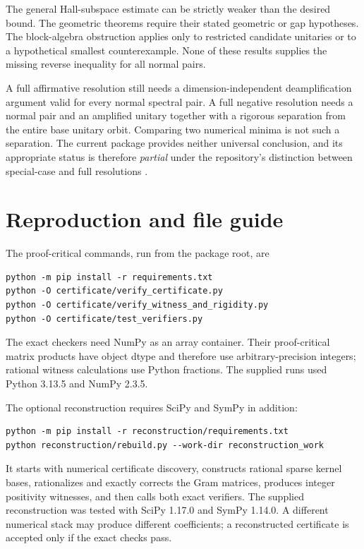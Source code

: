 \documentclass[11pt]{article}
\theoremstyle{definition}\newtheorem{definition}[theorem]{Definition}
\theoremstyle{remark}\newtheorem{remark}[theorem]{Remark}
\begin{document}
The general Hall-subspace estimate can be strictly weaker than the desired bound. The geometric theorems require their stated geometric or gap hypotheses. The block-algebra obstruction applies only to restricted candidate unitaries or to a hypothetical smallest counterexample. None of these results supplies the missing reverse inequality for all normal pairs.

A full affirmative resolution still needs a dimension-independent deamplification argument valid for every normal spectral pair. A full negative resolution needs a normal pair and an amplified unitary together with a rigorous separation from the entire base unitary orbit. Comparing two numerical minima is not such a separation. The current package provides neither universal conclusion, and its appropriate status is therefore \emph{partial} under the repository's distinction between special-case and full resolutions \cite{contributing}.

\appendix
\section{Reproduction and file guide}
The proof-critical commands, run from the package root, are
\begin{verbatim}
python -m pip install -r requirements.txt
python -O certificate/verify_certificate.py
python -O certificate/verify_witness_and_rigidity.py
python -O certificate/test_verifiers.py
\end{verbatim}
The exact checkers need NumPy as an array container. Their proof-critical matrix products have object dtype and therefore use arbitrary-precision integers; rational witness calculations use Python fractions. The supplied runs used Python 3.13.5 and NumPy 2.3.5.

The optional reconstruction requires SciPy and SymPy in addition:
\begin{verbatim}
python -m pip install -r reconstruction/requirements.txt
python reconstruction/rebuild.py --work-dir reconstruction_work
\end{verbatim}
It starts with numerical certificate discovery, constructs rational sparse kernel bases, rationalizes and exactly corrects the Gram matrices, produces integer positivity witnesses, and then calls both exact verifiers. The supplied reconstruction was tested with SciPy 1.17.0 and SymPy 1.14.0. A different numerical stack may produce different coefficients; a reconstructed certificate is accepted only if the exact checks pass.
\end{document}
